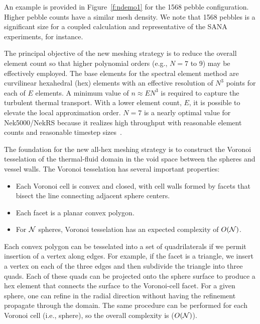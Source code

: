 An example is provided in Figure~\ref{f:ndemo1} for the 1568
pebble configuration. Higher pebble counts have a similar mesh density.
We note that 1568 pebbles is a significant size for a coupled calculation and
representative of the SANA experiments, for instance.

The principal objective of the new meshing strategy is to reduce the
overall element count so that higher polynomial orders (e.g., $N=7$
to 9) may be effectively employed.   The base elements for the
spectral element method are curvilinear hexahedral (hex) elements
with an effective resolution of $N^3$ points for each of $E$ elements.
A minimum value of $n \approx EN^3$ is required to capture the turbulent
thermal transport.  With a lower element count, $E$, it is possible to
elevate the local approximation order.  $N=7$ is a nearly optimal value
for Nek5000/NekRS because it realizes high throughput with reasonable
element counts and reasonable timestep sizes~\cite{fischer20a}.

The foundation for the new all-hex meshing strategy is to construct
the Voronoi tesselation of the thermal-fluid domain in the void space
between the spheres and vessel walls.  The Voronoi tesselation has
several important properties:
\begin{itemize}
  \item Each Voronoi cell is convex and closed, with cell walls formed
        by facets that bisect the line connecting adjacent sphere centers.
  \item Each facet is a planar convex polygon.
  \item For $\cal N$ spheres, Voronoi tesselation has an expected
        complexity of $O(\cal N)$.
\end{itemize}
Each convex polygon can be tesselated into a set of quadrilaterals
if we permit insertion of a vertex along edges.  For example, if the
facet is a triangle, we insert a vertex on each of the three
edges and then subdivide the triangle into three quads.  Each of these
quads can be projected onto the sphere surface to produce a hex element
that connects the surface to the Voronoi-cell facet.  For a given
sphere, one can refine in the radial direction without having the
refinement propagate through the domain.  The same procedure
can be performed for each Voronoi cell (i.e., sphere), so the
overall complexity is ($O(\cal N)$).

